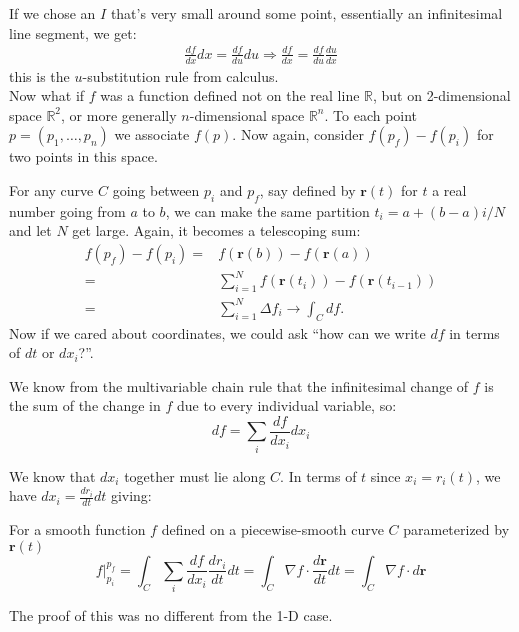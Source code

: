 	If we chose an $I$ that's very small around some point, essentially an infinitesimal line segment, we get:
	\begin{align*}
		\frac{df}{dx} dx =  \frac{df}{du} du \Rightarrow \frac{df}{dx} = \frac{df}{du} \frac{du}{dx}
	\end{align*}
	this is the $u$-substitution rule from calculus.
	\\

	
	Now what if $f$ was a function defined not on the real line $\mathbb{R}$, but on 2-dimensional space $\mathbb{R}^2$, or more generally $n$-dimensional space $\mathbb{R}^n$. To each point $p = (p_1, \dots, p_n)$ we associate $f(p)$. Now again, consider $f(p_f)-f(p_i)$ for two points in this space.
	
	For any curve $C$ going between $p_i$ and $p_f$, say defined by $\mathbf r(t)$ for $t$ a real number going from $a$ to $b$, we can make the same partition $t_i = a + (b-a)i/N$ and let $N$ get large. Again, it becomes a telescoping sum:
	\begin{align*}
		f(p_f) - f(p_i) = &f(\mathbf r(b)) - f(\mathbf r(a)) \\= & \sum_{i=1}^N f(\mathbf r(t_{i}))-f(\mathbf r(t_{i-1})) \\ = & \sum_{i=1}^N \Delta f_i  \rightarrow \int_C df.
	\end{align*}
	Now if we cared about coordinates, we could ask ``how can we write $df$ in terms of $dt$ or $dx_i$?''. 
	
	We know from the multivariable chain rule that the infinitesimal change of $f$ is the sum of the change in $f$ due to every individual variable, so: 
	\begin{equation}
		df = \sum_i \frac{df}{dx_i} dx_i
	\end{equation}

	We know that $dx_i$ together must lie along $C$. In terms of $t$ since $x_i = r_i (t)$, we have $dx_i = \frac{dr_i}{dt} dt$ giving:
	\begin{theorem}
	For a smooth function $f$ defined on a piecewise-smooth curve $C$ parameterized by $\mathbf r(t)$
		\begin{equation}
			f\rvert^{p_f}_{p_i} = \int_C \sum_i \frac{df}{dx_i} \frac{dr_i}{dt} dt = \int_C \nabla f \cdot \frac{d \mathbf r}{dt} dt =  \int_C \nabla f \cdot d \mathbf r
		\end{equation}
	\end{theorem}
	The proof of this was no different from the 1-D case.\\
	
